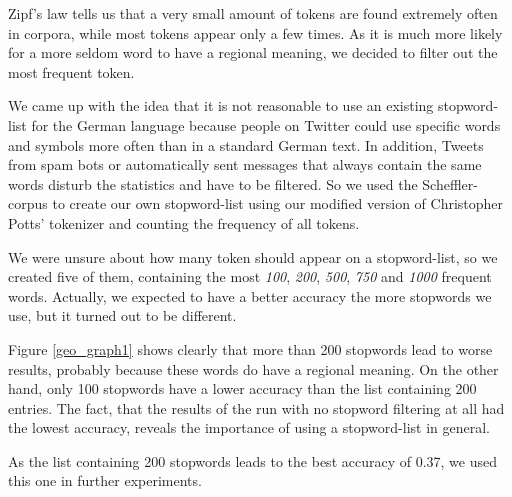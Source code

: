 \documentclass[./Main.tex]{subfiles}
\begin{document}
Zipf's law tells us that a very small amount of tokens are found extremely often in corpora, while most tokens appear only a few times. As it is much more likely for a more seldom word to have a regional meaning, we decided to filter out the most frequent token. 

We came up with the idea that it is not reasonable to use an existing stopword-list for the German language because people on Twitter could use specific words and symbols more often than in a standard German text. In addition, Tweets from spam bots or automatically sent messages that always contain the same words disturb the statistics and have to be filtered. So we used the Scheffler-corpus to create our own stopword-list using our modified version of Christopher Potts' tokenizer and counting the frequency of all tokens.

We were unsure about how many token should appear on a stopword-list, so we created five of them, containing the most \emph{100}, \emph{200}, \emph{500}, \emph{750} and \emph{1000} frequent words. Actually, we expected to have a better accuracy the more stopwords we use, but it turned out to be different.

Figure \ref{geo_graph1} shows clearly that more than 200 stopwords lead to worse results, probably because these words do have a regional meaning. On the other hand, only 100 stopwords have a lower accuracy than the list containing 200 entries. The fact, that the results of the run with no stopword filtering at all had the lowest accuracy, reveals the importance of using a stopword-list in general.

As the list containing 200 stopwords leads to the best accuracy of 0.37, we used this one in further experiments.
\end{document}
